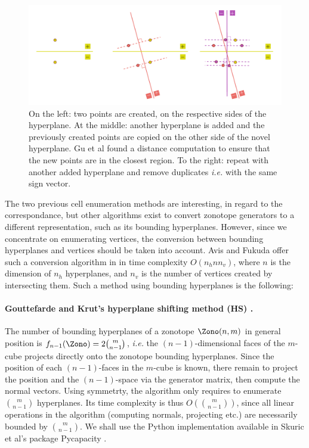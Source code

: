 \begin{figure}[!htb]
    \captionsetup{justification=centering}
    \centering
    
    \includegraphics[trim={20 0 20 0},clip,width=1\linewidth]{img/chapter_2/gu_et_al_alg.pdf}
    \caption{On the left: two points are created, on the respective sides of the hyperplane. At the middle: another hyperplane is added and the previously created points are copied on the other side of the novel hyperplane. Gu et al found a distance computation to ensure that the new points are in the closest region. To the right: repeat with another added hyperplane and remove duplicates \emph{i.e.} with the same sign vector.}
    \label{fig:gu_et_al_algo}
\end{figure}

The two previous cell enumeration methods are interesting, in regard to the correspondance, but other algorithms exist to convert zonotope generators to a different representation, such as its bounding hyperplanes. However, since we concentrate on enumerating vertices, the conversion between bounding hyperplanes and vertices should be taken into account. Avis and Fukuda offer such a conversion algorithm in \cite{avisPivotingAlgorithmConvex} in time complexity $O(n_h n n_v)$, where $n$ is the dimension of $n_h$ hyperplanes, and $n_v$ is the number of vertices created by intersecting them. Such a method using bounding hyperplanes is the following:

\paragraph*{Gouttefarde and Krut's hyperplane shifting method (HS) \cite{gouttefardeCharacterizationParallelManipulator2010a}.}
The number of bounding hyperplanes of a zonotope $\Zono(n,m)$ in general position is $f_{n-1}(\Zono) = 2\binom{m}{n-1}$, \emph{i.e.} the $(n-1)$-dimensional faces of the $m$-cube projects directly onto the zonotope bounding hyperplanes. Since the position of each $(n-1)$-faces in the $m$-cube is known, there remain to project the position and the $(n-1)$-space via the generator matrix, then compute the normal vectors. Using symmetrty, the algorithm only requires to enumerate $\binom{m}{n-1}$ hyperplanes. Its time complexity is thus $O(\binom{m}{n-1})$, since all linear operations in the algorithm (computing normals, projecting etc.) are necessarily bounded by $\binom{m}{n-1}$. We shall use the Python implementation available in Skuric et al's package Pycapacity \cite{skuricPycapacityRealtimeTaskspace2023}.

